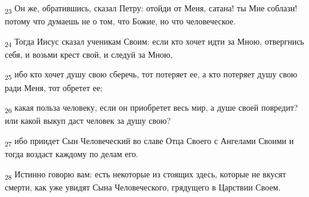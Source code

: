 \begin{tcolorbox}
\textsubscript{23} Он же, обратившись, сказал Петру: отойди от Меня, сатана! ты Мне соблазн! потому что думаешь не о том, что Божие, но что человеческое.
\end{tcolorbox}
\begin{tcolorbox}
\textsubscript{24} Тогда Иисус сказал ученикам Своим: если кто хочет идти за Мною, отвергнись себя, и возьми крест свой, и следуй за Мною,
\end{tcolorbox}
\begin{tcolorbox}
\textsubscript{25} ибо кто хочет душу свою сберечь, тот потеряет ее, а кто потеряет душу свою ради Меня, тот обретет ее;
\end{tcolorbox}
\begin{tcolorbox}
\textsubscript{26} какая польза человеку, если он приобретет весь мир, а душе своей повредит? или какой выкуп даст человек за душу свою?
\end{tcolorbox}
\begin{tcolorbox}
\textsubscript{27} ибо приидет Сын Человеческий во славе Отца Своего с Ангелами Своими и тогда воздаст каждому по делам его.
\end{tcolorbox}
\begin{tcolorbox}
\textsubscript{28} Истинно говорю вам: есть некоторые из стоящих здесь, которые не вкусят смерти, как уже увидят Сына Человеческого, грядущего в Царствии Своем.
\end{tcolorbox}
